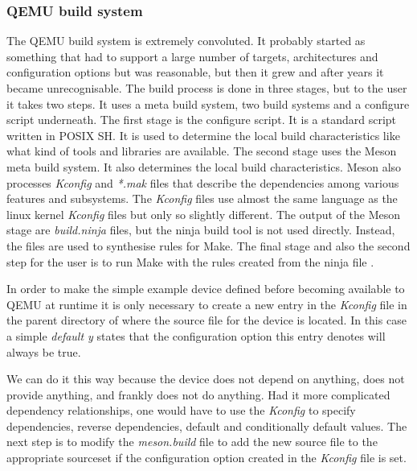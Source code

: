 \begin{codeblock}
    
\end{codeblock}

\subsubsection{QEMU build system}

The QEMU build system is extremely convoluted. It probably started as something
that had to support a large number of targets, architectures and configuration
options but was reasonable, but then it grew and after years it became
unrecognisable. The build process is done in three stages, but to the user it
takes two steps. It uses a meta build system, two build systems and a configure
script underneath. The first stage is the configure script. It is a standard
script written in POSIX SH. It is used to determine the local build
characteristics like what kind of tools and libraries are available. The second
stage uses the Meson meta build system. It also determines the local build
characteristics. Meson also processes \emph{Kconfig} and \emph{*.mak} files
that describe the dependencies among various features and subsystems. The
\emph{Kconfig} files use almost the same language as the linux kernel
\emph{Kconfig} files but only so slightly different. The output of the Meson
stage are \emph{build.ninja} files, but the ninja build tool is not used
directly.  Instead, the files are used to synthesise rules for Make. The final
stage and also the second step for the user is to run Make with the rules
created from the ninja file \cite{qemu2022}.

In order to make the simple example device defined before becoming available to QEMU at
runtime it is only necessary to create a new entry in the \emph{Kconfig} file
in the parent directory of where the source file for the device is located. In
this case a simple \emph{default y} states that the configuration option this
entry denotes will always be true.

\begin{codeblock}
    
\end{codeblock}

\noindent
We can do it this way because the device does not depend on anything, does not
provide anything, and frankly does not do anything. Had it more complicated
dependency relationships, one would have to use the \emph{Kconfig} to specify
dependencies, reverse dependencies, default and conditionally default values.
The next step is to modify the \emph{meson.build} file to add the new source
file to the appropriate sourceset if the configuration option created in the
\emph{Kconfig} file is set.

